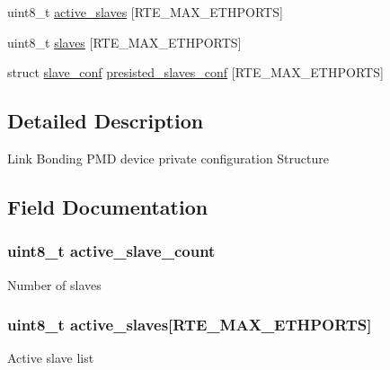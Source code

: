 \begin{DoxyCompactItemize}
\item 
uint8\+\_\+t \hyperlink{structbond__dev__private_ac51b4f1d7833da4106f7c90dc623fe37}{active\+\_\+slaves} \mbox{[}R\+T\+E\+\_\+\+M\+A\+X\+\_\+\+E\+T\+H\+P\+O\+R\+T\+S\mbox{]}
\item 
uint8\+\_\+t \hyperlink{structbond__dev__private_aabe27a69cb59cc9e6a45c0f59a941cf9}{slaves} \mbox{[}R\+T\+E\+\_\+\+M\+A\+X\+\_\+\+E\+T\+H\+P\+O\+R\+T\+S\mbox{]}
\item 
struct \hyperlink{structslave__conf}{slave\+\_\+conf} \hyperlink{structbond__dev__private_aa082a5fca72edb6b65579350f9ee6cec}{presisted\+\_\+slaves\+\_\+conf} \mbox{[}R\+T\+E\+\_\+\+M\+A\+X\+\_\+\+E\+T\+H\+P\+O\+R\+T\+S\mbox{]}
\end{DoxyCompactItemize}


\subsection{Detailed Description}
Link Bonding P\+M\+D device private configuration Structure 

\subsection{Field Documentation}
\hypertarget{structbond__dev__private_a4a2bb0c7965b8ede372d218d270465e0}{}
\subsubsection[{active\+\_\+slave\+\_\+count}]{\setlength{\rightskip}{0pt plus 5cm}uint8\+\_\+t active\+\_\+slave\+\_\+count}\label{structbond__dev__private_a4a2bb0c7965b8ede372d218d270465e0}
Number of slaves \hypertarget{structbond__dev__private_ac51b4f1d7833da4106f7c90dc623fe37}{}
\subsubsection[{active\+\_\+slaves}]{\setlength{\rightskip}{0pt plus 5cm}uint8\+\_\+t active\+\_\+slaves\mbox{[}R\+T\+E\+\_\+\+M\+A\+X\+\_\+\+E\+T\+H\+P\+O\+R\+T\+S\mbox{]}}\label{structbond__dev__private_ac51b4f1d7833da4106f7c90dc623fe37}
Active slave list \hypertarget{structbond__dev__private_a39595da5d563085994b8584c3220571b}{}
